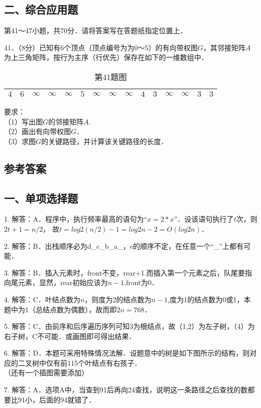 \subsection{二、综合应用题}
第41～47小题，共70分．请将答案写在答题纸指定位置上．

41．（8分）已知有$6$个顶点（顶点编号为为$0$～$5$）的有向带权图$G$，其邻接矩阵$A$为上三角矩阵，按行为主序（行优先）保存在如下的一维数组中．
\begin{table}[ht]
\centering
\caption{第41题图}\label{Na11_tab1}
\begin{tabular}{|c|c|c|c|c|c|c|c|c|c|c|c|c|c|c|}
\hline
$4$ & $6$ & $\infty$ & $\infty$ & $\infty$ & $5$ & $\infty$ & $\infty$ & $\infty$ & $4$ & $3$ & $\infty$ & $\infty$ & $3$ & $3$ \\
\hline
\end{tabular}
\end{table}
要求：  \\
（1）写出图$G$的邻接矩阵$A$.  \\
（2）画出有向带权图$G$．  \\
（3）求图$G$的关键路径，并计算该关键路径的长度．




\subsection{参考答案}
\subsection{一、单项选择题}
1. 解答：A．程序中，执行频率最高的语句为“$x=2*x$”．设该语句执行了$t$次，则$2t+1=n/2$， 故$t=log2(n/2)-1=log2n-2= O(log2n)$．

2. 解答：B．出栈顺序必为d_c_b_a_，e的顺序不定，在任意一个“_”上都有可能．

3. 解答：B．插入元素时，front不变，rear+1.而插入第一个元素之后，队尾要指向尾元素，显然，rear初始应该为$n-1$,front为$0$．

4. 解答：C．叶结点数为$n$，则度为2的结点数为$n-1$,度为1的结点数为0或1，本题中为1（总结点数为偶数），故而即$2n=768$．

5. 解答：C．由前序和后序遍历序列可知3为根结点，故（1,2）为左子树，（4）为右子树，C不可能．或画图即可得出结果．

6. 解答：D．本题可采用特殊情况法解．设题意中的树是如下图所示的结构，则对应的二叉树中仅有前115个叶结点有右孩子．\\
（还有一个插图需要添加）

7. 解答：A．选项A中，当查到91后再向24查找，说明这一条路径之后查找的数都要比91小，后面的94就错了．

